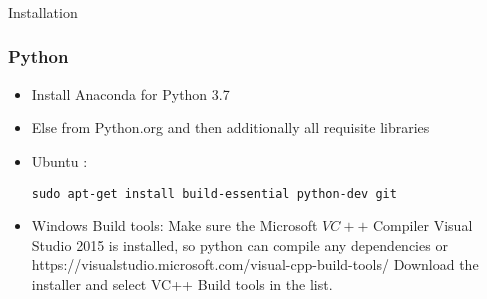 \begin{frame}[fragile]\frametitle{}
\begin{center}
{\Large Installation}

\end{center}
\end{frame}



 \begin{frame}[fragile]\frametitle{Python}
\begin{itemize}
\item Install Anaconda for Python 3.7 %
\item Else from Python.org and then additionally all requisite libraries
\item Ubuntu : 
\begin{lstlisting}
sudo apt-get install build-essential python-dev git
\end{lstlisting}
\item Windows Build tools: Make sure the Microsoft $VC++$ Compiler Visual Studio 2015 is installed, so python can compile any dependencies or https://visualstudio.microsoft.com/visual-cpp-build-tools/ Download the installer and select VC++ Build tools in the list.
\end{itemize}


\end{frame}

